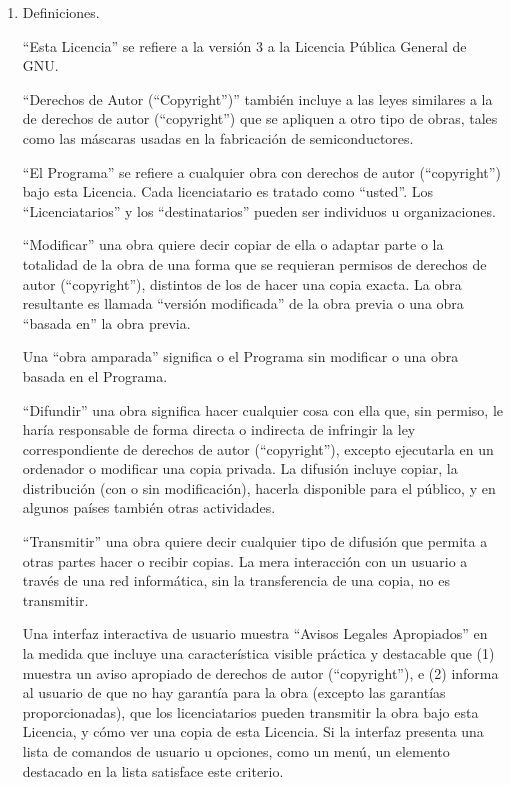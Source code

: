 \documentclass[11pt]{article}
\begin{document}
\begin{enumerate}

\addtocounter{enumi}{-1}

\item Definiciones.

``Esta Licencia'' se refiere a la versi\'{o}n 3 a la Licencia P\'{u}blica 
General de GNU.

``Derechos de Autor (``Copyright'')'' tambi\'{e}n incluye a las leyes similares a la de derechos de autor (``copyright'') 
que se apliquen a otro tipo de obras, tales como las m\'{a}scaras usadas 
en la fabricaci\'{o}n de semiconductores.

``El Programa'' se refiere a cualquier obra con derechos de autor (``copyright'') 
bajo esta Licencia.  Cada licenciatario es tratado como ``usted''. Los ``Licenciatarios'' y los ``destinatarios'' pueden ser individuos u organizaciones.

``Modificar'' una obra quiere decir copiar de ella o adaptar parte o la 
totalidad de la obra de una forma que se requieran permisos de derechos de autor (``copyright''), 
distintos de los de hacer una copia exacta. La obra resultante es 
llamada ``versi\'{o}n modificada'' de la obra previa o una obra ``basada en'' 
la obra previa.

Una ``obra amparada'' significa o el Programa sin modificar o una obra 
basada en el Programa.

``Difundir'' una obra significa hacer cualquier cosa con ella que, sin
permiso, le har\'{i}a responsable de forma directa o indirecta de infringir
la ley correspondiente de derechos de autor (``copyright''), excepto ejecutarla en un ordenador
o modificar una copia privada. La difusi\'{o}n incluye copiar, la 
distribuci\'{o}n (con o sin modificaci\'{o}n), hacerla disponible para el 
p\'{u}blico, y en algunos pa\'{i}ses tambi\'{e}n otras actividades.

``Transmitir'' una obra quiere decir cualquier tipo de difusi\'{o}n que 
permita a otras partes hacer o recibir copias.  La mera interacci\'{o}n con
un usuario a trav\'{e}s de una red inform\'{a}tica, sin la transferencia de una 
copia, no es transmitir.

Una interfaz interactiva de usuario muestra ``Avisos Legales Apropiados''
en la medida que incluye una caracter\'{i}stica visible pr\'{a}ctica y 
destacable que (1) muestra un aviso apropiado de derechos de autor (``copyright''), e (2)
informa al usuario de que no hay garant\'{i}a para la obra (excepto las 
garant\'{i}as proporcionadas), que los licenciatarios pueden transmitir la 
obra bajo esta Licencia, y c\'{o}mo ver una copia de esta Licencia. 
Si la interfaz presenta una lista de comandos de usuario u opciones, 
como un men\'{u}, un elemento destacado en la lista satisface este criterio.


\end{enumerate}
\end{document}

